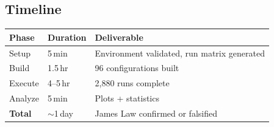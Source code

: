 \subsection{Timeline}

\begin{center}
\begin{tabular}{lll}
\toprule
Phase    & Duration       & Deliverable \\
\midrule
Setup    & 5\,min         & Environment validated, run matrix generated \\
Build    & 1.5\,hr        & 96 configurations built \\
Execute  & 4--5\,hr       & 2{,}880 runs complete \\
Analyze  & 5\,min         & Plots + statistics \\
\textbf{Total} & $\sim$1\,day & James Law confirmed or falsified \\
\bottomrule
\end{tabular}
\end{center}
